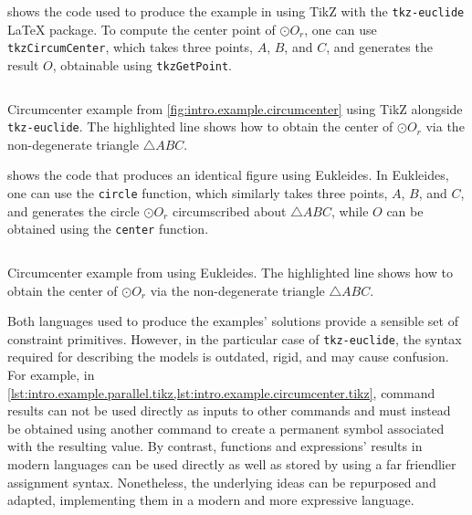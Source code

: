  shows the code used to produce the
example in  using \acs{TikZ} with the
\texttt{tkz-euclide} \LaTeX{} package.  To compute the center point of $\odot
O_r$, one can use \texttt{tkzCircumCenter}, which takes three points, $A$, $B$,
and $C$, and generates the result $O$, obtainable using \texttt{tkzGetPoint}.

\begin{listing}[htb]
  \inputminted[highlightlines=3]{latex}{tikz/ex-circumcenter.tikz}
  \caption[Circumcenter example using TikZ]{
    Circumcenter example from \cref{fig:intro.example.circumcenter} using
    \acs{TikZ} alongside \texttt{tkz-euclide}.  The highlighted line shows how
    to obtain the center of $\odot O_r$ via the non-degenerate triangle
    $\triangle ABC$.}%
  \label{lst:intro.example.circumcenter.tikz}
\end{listing}

 shows the code that produces an
identical figure using Eukleides.  In Eukleides, one can use the \texttt{circle}
function, which similarly takes three points, $A$, $B$, and $C$, and generates
the circle $\odot O_r$ circumscribed about $\triangle ABC$, while $O$ can be
obtained using the \texttt{center} function.

\begin{listing}[htb]
  \inputminted[highlightlines=2]{text}{euk/ex-circumcenter.euk}
  \caption[Circumcenter example using Eukleides]{
    Circumcenter example from  using
    Eukleides.  The highlighted line shows how to obtain the center of $\odot
    O_r$ via the non-degenerate triangle $\triangle ABC$.}%
  \label{lst:intro.example.circumcenter.euk}
\end{listing}

Both languages used to produce the examples' solutions provide a sensible set of
constraint primitives.  However, in the particular case of \texttt{tkz-euclide},
the syntax required for describing the models is outdated, rigid, and may cause
confusion.  For example, in
\cref{lst:intro.example.parallel.tikz,lst:intro.example.circumcenter.tikz},
command results can not be used directly as inputs to other commands and must
instead be obtained using another command to create a permanent symbol
associated with the resulting value.  By contrast, functions and expressions'
results in modern languages can be used directly as well as stored by using a
far friendlier assignment syntax.  Nonetheless, the underlying ideas can be
repurposed and adapted, implementing them in a modern and more expressive
language.
